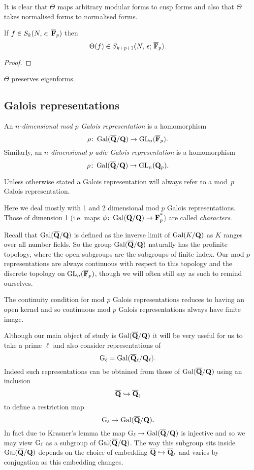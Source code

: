 \documentclass[a4paper,12pt]{article}
\begin{document}
It is clear that $\Theta$ maps arbitrary modular forms to cusp forms and also that $\Theta$ takes normalised forms to normalised forms.

\begin{prop}
If $f\in S_k(N,\,\epsilon;\,\overline{\mathbf{F}}_p)$ then
\[
\Theta(f)\in S_{k+p+1}(N,\,\epsilon;\,\overline{\mathbf{F}}_p).
\]
\end{prop}
\begin{proof}
\end{proof}

\begin{prop}
$\Theta$ preserves eigenforms.
\end{prop}


\subsection{Galois representations}\label{sec:gals}
\begin{defn}
An \emph{$n$-dimensional mod $p$ Galois representation} is a homomorphism
\[
\rho\colon \operatorname{Gal}(\overline{\mathbf{Q}}/\mathbf{Q}) \to \operatorname{GL}_n(\overline{\mathbf{F}}_p).
\]
Similarly, an \emph{$n$-dimensional $p$-adic Galois representation} is a homomorphism
\[
\rho\colon \operatorname{Gal}(\overline{\mathbf{Q}}/\mathbf{Q}) \to \operatorname{GL}_n(\mathbf{Q}_p).
\]

Unless otherwise stated a Galois representation will always refer to a mod~$p$ Galois representation.
\end{defn}

Here we deal mostly with 1 and 2 dimensional mod $p$ Galois representations.
Those of dimension 1 (i.e. maps $\phi\colon\operatorname{Gal}(\overline{\mathbf{Q}}/\mathbf{Q}) \to \overline{\mathbf{F}}_p^*$) are called \emph{characters}.

Recall that $\operatorname{Gal}(\overline{\mathbf{Q}}/\mathbf{Q})$ is defined as the inverse limit of $\operatorname{Gal}(K/\mathbf{Q})$ as $K$ ranges over all number fields.
So the group $\operatorname{Gal}(\overline{\mathbf{Q}}/\mathbf{Q})$ naturally has the profinite topology, where the open subgroups are the subgroups of finite index.
Our mod $p$ representations are always continuous with respect to this topology and the discrete topology on $\operatorname{GL}_n(\overline{\mathbf{F}}_p)$, though we will often still say as such to remind ourselves.

\begin{rmk}\label{rmk:ctsfin}
The continuity condition for mod $p$ Galois representations reduces to having an open kernel and so continuous mod $p$ Galois representations always have finite image.
\end{rmk}

Although our main object of study is $\operatorname{Gal}(\overline{\mathbf{Q}}/\mathbf{Q})$ it will be very useful for us to take a prime $\ell$ and also consider representations of
\[
\mathrm{G}_\ell = \operatorname{Gal}(\overline{\mathbf{Q}}_\ell/\mathbf{Q}_\ell).
\]
Indeed such representations can be obtained from those of $\operatorname{Gal}(\overline{\mathbf{Q}}/\mathbf{Q})$ using an inclusion
\[
\overline{\mathbf{Q}} \hookrightarrow \overline{\mathbf{Q}}_\ell
\]
to define a restriction map
\[
\mathrm{G}_\ell \to \operatorname{Gal}(\overline{\mathbf{Q}}/\mathbf{Q}).
\]
In fact due to Krasner's lemma \cite[p. 238]{Cohen} the map $\mathrm{G}_\ell \to \operatorname{Gal}(\overline{\mathbf{Q}}/\mathbf{Q})$ is injective and so we may view $\mathrm{G}_\ell$ as a subgroup of $\operatorname{Gal}(\overline{\mathbf{Q}}/\mathbf{Q})$.
The way this subgroup sits inside $\operatorname{Gal}(\overline{\mathbf{Q}}/\mathbf{Q})$ depends on the choice of embedding $\overline{\mathbf{Q}} \hookrightarrow \overline{\mathbf{Q}}_\ell$ and varies by conjugation as this embedding changes.
\end{document}
